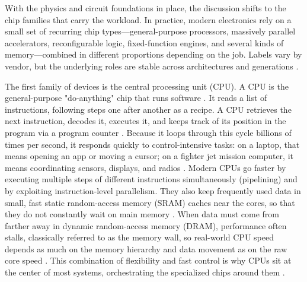 With the physics and circuit foundations in place, the discussion shifts to the chip families that carry the workload. In practice, modern electronics rely on a small set of recurring chip types---general-purpose processors, massively parallel accelerators, reconfigurable logic, fixed-function engines, and several kinds of memory---combined in different proportions depending on the job. Labels vary by vendor, but the underlying roles are stable across architectures and generations \parencite{hennessy_computer_2012,rabaey_digital_2003}.

The first family of devices is the central processing unit (CPU). A CPU is the general-purpose "do-anything" chip that runs software \parencite{patterson_computer_2018}. It reads a list of instructions, following steps one after another as a recipe. A CPU retrieves the next instruction, decodes it, executes it, and keeps track of its position in the program via a program counter \parencite{harris_digital_2022}. Because it loops through this cycle billions of times per second, it responds quickly to control-intensive tasks: on a laptop, that means opening an app or moving a cursor; on a fighter jet mission computer, it means coordinating sensors, displays, and radios \parencite{patterson_computer_2018}. Modern CPUs go faster by executing multiple steps of different instructions simultaneously (pipelining) and by exploiting instruction-level parallelism. They also keep frequently used data in small, fast static random-access memory (SRAM) caches near the cores, so that they do not constantly wait on main memory \parencite{hennessy_computer_2012,weste_cmos_2011,rabaey_digital_2003}. When data must come from farther away in dynamic random-access memory (DRAM), performance often stalls, classically referred to as the memory wall, so real-world CPU speed depends as much on the memory hierarchy and data movement as on the raw core speed \parencite{jacob_memory_2008,wulf_hitting_1995}. This combination of flexibility and fast control is why CPUs sit at the center of most systems, orchestrating the specialized chips around them \parencite{patterson_computer_2018}.

